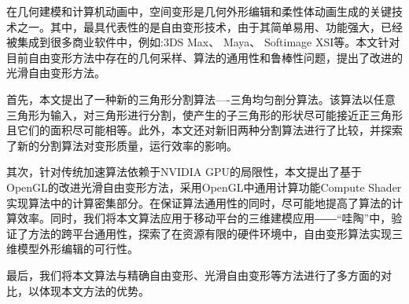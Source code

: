 
\begin{cabstract}

    在几何建模和计算机动画中，空间变形是几何外形编辑和柔性体动画生成的关键技术之一。其中，最具代表性的是自由变形技术，由于其简单易用、功能强大，已经被集成到很多商业软件中，例如:3DS Max、 Maya、 Softimage XSI等。本文针对目前自由变形方法中存在的几何采样、算法的通用性和鲁棒性问题，提出了改进的光滑自由变形方法。

    首先，本文提出了一种新的三角形分割算法----三角均匀剖分算法。该算法以任意三角形为输入，对三角形进行分割，使产生的子三角形的形状尽可能接近正三角形且它们的面积尽可能相等。此外，本文还对新旧两种分割算法进行了比较，并探索了新的分割算法对变形质量，运行效率的影响。

    其次，针对传统加速算法依赖于NVIDIA GPU的局限性，本文提出了基于OpenGL的改进光滑自由变形方法，采用OpenGL中通用计算功能Compute Shader实现算法中的计算密集部分。在保证算法通用性的同时，尽可能地提高了算法的计算效率。同时，我们将本文算法应用于移动平台的三维建模应用――“哇陶”中，验证了方法的跨平台通用性，探索了在资源有限的硬件环境中，自由变形算法实现三维模型外形编辑的可行性。

    最后，我们将本文算法与精确自由变形、光滑自由变形等方法进行了多方面的对比，以体现本文方法的优势。


\end{cabstract}


